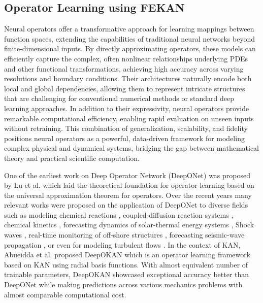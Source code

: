 \documentclass{article}
\begin{document}

\subsection{Operator Learning using FEKAN}
Neural operators offer a transformative approach for learning mappings between function spaces, extending the capabilities of traditional neural networks beyond finite-dimensional inputs. By directly approximating operators, these models can efficiently capture the complex, often nonlinear relationships underlying PDEs and other functional transformations, achieving high accuracy across varying resolutions and boundary conditions. Their architectures naturally encode both local and global dependencies, allowing them to represent intricate structures that are challenging for conventional numerical methods or standard deep learning approaches. In addition to their expressivity, neural operators provide remarkable computational efficiency, enabling rapid evaluation on unseen inputs without retraining. This combination of generalization, scalability, and fidelity positions neural operators as a powerful, data-driven framework for modeling complex physical and dynamical systems, bridging the gap between mathematical theory and practical scientific computation.

One of the earliest work on Deep Operator Network (DeepONet) was proposed by Lu et al. \cite{lu2021learning} which laid the theoretical foundation for operator learning based on the universal approximation theorem for operators. Over the recent years many relevant works were proposed on the application of DeepONet to diverse fields such as modeling chemical reactions \cite{mao2020physics}, coupled-diffusion reaction systems \cite{Jin2022}, chemical kinetics \cite{goswami2024learning}, forecasting dynamics of solar-thermal energy systems \cite{osorio2022forecasting}, Shock waves \cite{peyvan2024riemannonets}, real-time monitoring of off-shore structures \cite{cao2024deep}, forecasting seismic-wave propagation \cite{yang2021seismic}, or even for modeling turbulent flows \cite{li2024transformer}. In the context of KAN, Abueidda \cite{abueidda2025deepokan} et al. proposed DeepOKAN which is an operator learning framework based on KAN using radial basis functions. With almost equivalent number of trainable parameters, DeepOKAN showcased exceptional accuracy better than DeepONet while making predictions across various mechanics problems with almost comparable computational cost. 
\end{document}
